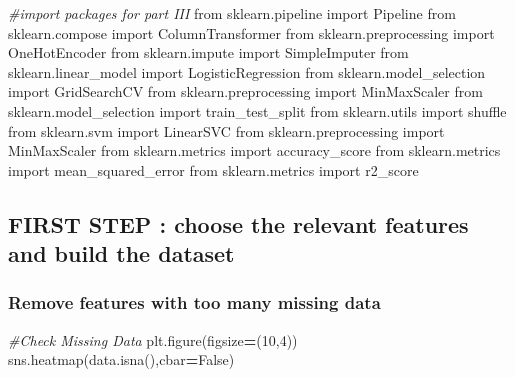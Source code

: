 \documentclass[10pt,a4paper]{article}
\newenvironment{Shaded}{\begin{snugshade}}{\end{snugshade}}
\newcommand{\CommentTok}[1]{\textcolor[rgb]{0.56,0.35,0.01}{\textit{#1}}}
\newcommand{\DecValTok}[1]{\textcolor[rgb]{0.00,0.00,0.81}{#1}}
\newcommand{\ImportTok}[1]{#1}
\newcommand{\NormalTok}[1]{#1}
\newcommand{\OperatorTok}[1]{\textcolor[rgb]{0.81,0.36,0.00}{\textbf{#1}}}
\newcommand{\VariableTok}[1]{\textcolor[rgb]{0.00,0.00,0.00}{#1}}
\theoremstyle{break}
\begin{document}
\begin{Shaded}
\begin{Highlighting}[]
\CommentTok{#import packages for part III}
\ImportTok{from}\NormalTok{ sklearn.pipeline }\ImportTok{import}\NormalTok{ Pipeline}
\ImportTok{from}\NormalTok{ sklearn.compose }\ImportTok{import}\NormalTok{ ColumnTransformer}
\ImportTok{from}\NormalTok{ sklearn.preprocessing }\ImportTok{import}\NormalTok{ OneHotEncoder}
\ImportTok{from}\NormalTok{ sklearn.impute }\ImportTok{import}\NormalTok{ SimpleImputer}
\ImportTok{from}\NormalTok{ sklearn.linear_model }\ImportTok{import}\NormalTok{ LogisticRegression}
\ImportTok{from}\NormalTok{ sklearn.model_selection }\ImportTok{import}\NormalTok{ GridSearchCV}
\ImportTok{from}\NormalTok{ sklearn.preprocessing }\ImportTok{import}\NormalTok{ MinMaxScaler}
\ImportTok{from}\NormalTok{ sklearn.model_selection }\ImportTok{import}\NormalTok{ train_test_split}
\ImportTok{from}\NormalTok{ sklearn.utils }\ImportTok{import}\NormalTok{ shuffle}
\ImportTok{from}\NormalTok{ sklearn.svm }\ImportTok{import}\NormalTok{ LinearSVC}
\ImportTok{from}\NormalTok{ sklearn.preprocessing }\ImportTok{import}\NormalTok{ MinMaxScaler}
\ImportTok{from}\NormalTok{ sklearn.metrics }\ImportTok{import}\NormalTok{ accuracy_score}
\ImportTok{from}\NormalTok{ sklearn.metrics }\ImportTok{import}\NormalTok{ mean_squared_error}
\ImportTok{from}\NormalTok{ sklearn.metrics }\ImportTok{import}\NormalTok{ r2_score}
\end{Highlighting}
\end{Shaded}

\hypertarget{first-step-choose-the-relevant-features-and-build-the-dataset-1}{%
\subsection{FIRST STEP : choose the relevant features and build the dataset}\label{first-step-choose-the-relevant-features-and-build-the-dataset-1}}

\hypertarget{remove-features-with-too-many-missing-data}{%
\subsubsection{Remove features with too many missing data}\label{remove-features-with-too-many-missing-data}}

\begin{Shaded}
\begin{Highlighting}[]
\CommentTok{#Check Missing Data}
\NormalTok{plt.figure(figsize}\OperatorTok{=}\NormalTok{(}\DecValTok{10}\NormalTok{,}\DecValTok{4}\NormalTok{))}
\NormalTok{sns.heatmap(data.isna(),cbar}\OperatorTok{=}\VariableTok{False}\NormalTok{)}
\end{Highlighting}
\end{Shaded}
\end{document}
